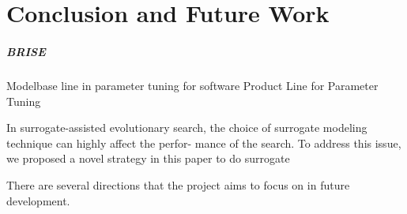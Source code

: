 \chapter{Conclusion and Future Work}\label{sec:conclusion}



         \paragraph{BRISE}
         Modelbase line in parameter tuning for software Product Line for Parameter Tuning




         In surrogate-assisted evolutionary search, the choice of surrogate modeling technique can highly affect the perfor- mance of the search. To address this issue, we proposed a novel strategy in this paper to do surrogate


         There are several directions that the project aims to focus on in future development. 












